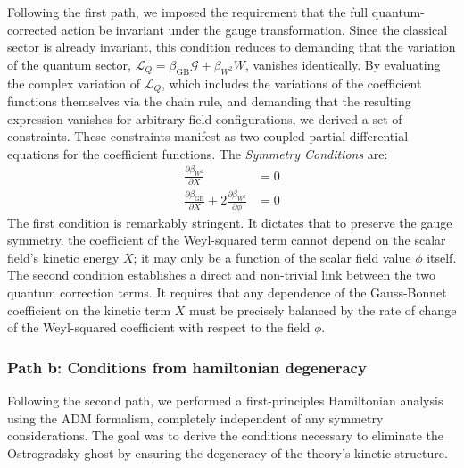 \documentclass[twocolumn]{aastex631}
\begin{document}
Following the first path, we imposed the requirement that the full quantum-corrected action be invariant under the gauge transformation. Since the classical sector is already invariant, this condition reduces to demanding that the variation of the quantum sector, $\mathcal{L}_Q = \beta_{\text{GB}}\mathcal{G} + \beta_{W^2}W$, vanishes identically. By evaluating the complex variation of $\mathcal{L}_Q$, which includes the variations of the coefficient functions themselves via the chain rule, and demanding that the resulting expression vanishes for arbitrary field configurations, we derived a set of constraints. These constraints manifest as two coupled partial differential equations for the coefficient functions. The \textit{Symmetry Conditions} are:
\begin{align}
    \frac{\partial\beta_{W^2}}{\partial X} &= 0 \label{eq:sym_cond1} \\
    \frac{\partial\beta_{\text{GB}}}{\partial X} + 2 \frac{\partial\beta_{W^2}}{\partial\phi} &= 0 \label{eq:sym_cond2}
\end{align}
The first condition is remarkably stringent. It dictates that to preserve the gauge symmetry, the coefficient of the Weyl-squared term cannot depend on the scalar field's kinetic energy $X$; it may only be a function of the scalar field value $\phi$ itself. The second condition establishes a direct and non-trivial link between the two quantum correction terms. It requires that any dependence of the Gauss-Bonnet coefficient on the kinetic term $X$ must be precisely balanced by the rate of change of the Weyl-squared coefficient with respect to the field $\phi$.

\subsubsection{Path b: Conditions from hamiltonian degeneracy}

Following the second path, we performed a first-principles Hamiltonian analysis using the ADM formalism, completely independent of any symmetry considerations. The goal was to derive the conditions necessary to eliminate the Ostrogradsky ghost by ensuring the degeneracy of the theory's kinetic structure.
\end{document}
